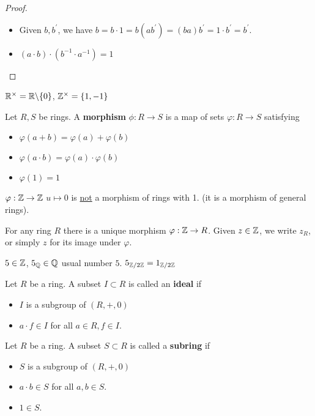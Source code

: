 \begin{proof} \hspace{0.5cm}
    \begin{itemize}
        \item Given $b, b^\prime$, we have $b = b \cdot 1 = b(ab^\prime) = (ba)b^\prime = 1 \cdot b^\prime
         = b^\prime$.
         \item $(a \cdot b) \cdot (b^{-1} \cdot a^{-1}) = 1$
    \end{itemize}
\end{proof}
\begin{ex}
    $\mathbb{R}^\times = \mathbb{R} \backslash \{0\}$, $\mathbb{Z}^\times = \{1, -1\}$
\end{ex}
\begin{defn}
    Let $R, S$ be rings. A \textbf{morphism} $\phi:R \rightarrow S$ is a map of
    sets $\varphi:R \rightarrow S$ satisfying
    \begin{itemize}
        \item $\varphi(a + b) = \varphi(a) + \varphi(b)$
        \item $\varphi(a \cdot b) = \varphi(a) \cdot \varphi(b)$
        \item $\varphi(1) = 1$
    \end{itemize}
\end{defn}
\begin{ex}
    $\varphi:\mathbb{Z} \rightarrow \mathbb{Z}$ $u \mapsto 0$ is \underline{not} a morphism of
    rings with 1. (it is a morphism of general rings).
\end{ex}
\begin{fact}\label{fact:!morph}
    For any ring $R$ there is a unique morphism $\varphi:\mathbb{Z} \rightarrow R$. Given
    $z \in \mathbb{Z}$, we write $z_{R}$, or simply $z$ for its image under $\varphi$.
\end{fact}
\begin{ex}
    $5 \in \mathbb{Z}$, $5_{\mathbb{Q}} \in \mathbb{Q}$ usual number $5$. $5_{\mathbb{Z} / 2 \mathbb{Z}} = 1_{\mathbb{Z} / 2 \mathbb{Z}}$
\end{ex}
\begin{defn}
    Let $R$ be a ring. A subset $I \subset R$ is called an \textbf{ideal} if
    \begin{itemize}
        \item $I$ is a subgroup of $(R, +, 0)$
        \item $a \cdot f \in I$ for all $a \in R, f \in I$.
    \end{itemize}
\end{defn}
\begin{defn}
    Let $R$ be a ring. A subset $S \subset R$ is called a \textbf{subring} if
    \begin{itemize}
        \item $S$ is a subgroup of $(R, +, 0)$
        \item $a \cdot b \in S$ for all $a, b \in S$.
        \item $1 \in S$.
    \end{itemize}
\end{defn}
